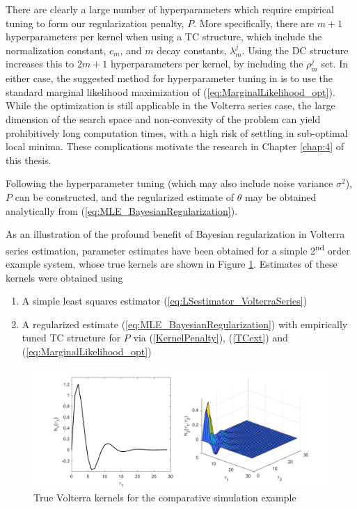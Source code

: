 There are clearly a large number of hyperparameters which require empirical tuning to form our regularization penalty, $P$. More specifically, there are $m+1$ hyperparameters per kernel when using a TC structure, which include the normalization constant, $c_m$, and $m$ decay constants, $\lambda_m^j$. Using the DC structure increases this to $2m+1$ hyperparameters per kernel, by including the $\rho_m^j$ set. In either case, the suggested method for hyperparameter tuning in \cite{Birpoutsoukis2017} is to use the standard marginal likelihood maximization of (\ref{eq:MarginalLikelihood_opt}). While the optimization is still applicable in the Volterra series case, the large dimension of the search space and non-convexity of the problem can yield prohibitively long computation times, with a high risk of settling in sub-optimal local minima. These complications motivate the research in Chapter \ref{chap:4} of this thesis.

Following the hyperparameter tuning (which may also include noise variance $\sigma^2$), $P$ can be constructed, and the regularized estimate of $\theta$ may be obtained analytically from (\ref{eq:MLE_BayesianRegularization}).

As an illustration of the profound benefit of Bayesian regularization in Volterra series estimation, parameter estimates have been obtained for a simple 2\textsuperscript{nd} order example system, whose true kernels are shown in Figure \ref{fig:ExampleLSvsReLS_TrueKernels}. Estimates of these kernels were obtained using 
\begin{enumerate}
\item A simple least squares estimator (\ref{eq:LSestimator_VolterraSeries})
\item A regularized estimate (\ref{eq:MLE_BayesianRegularization}) with empirically tuned TC structure for $P$ via (\ref{KernelPenalty}), (\ref{TCext}) and (\ref{eq:MarginalLikelihood_opt})
\end{enumerate}

\begin{figure}[h]
\centering
\includegraphics[width = 1\textwidth]{Chapter3_VolterraSeries/LSvsReLS_truekernels.pdf}
\caption{True Volterra kernels for the comparative simulation example}
\label{fig:ExampleLSvsReLS_TrueKernels}
\end{figure}

